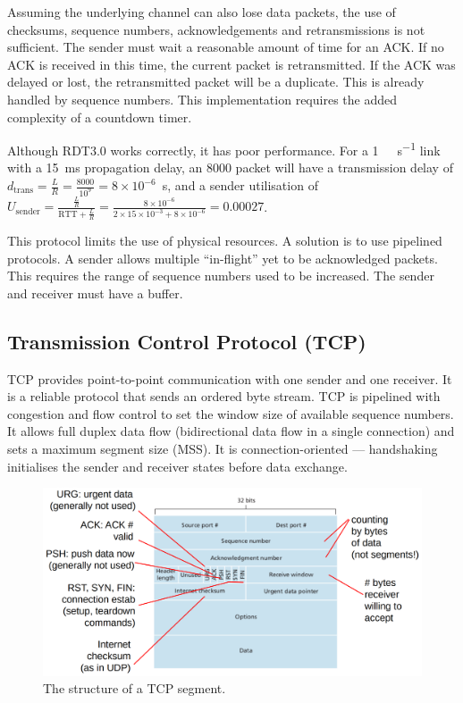 Assuming the underlying channel can also lose data packets, the use of checksums, sequence numbers, acknowledgements and retransmissions is not sufficient.
The sender must wait a reasonable amount of time for an ACK\@.
If no ACK is received in this time, the current packet is retransmitted.
If the ACK was delayed or lost, the retransmitted packet will be a duplicate.
This is already handled by sequence numbers.
This implementation requires the added complexity of a countdown timer.

Although RDT3.0 works correctly, it has poor performance.
For a \SI{1}{\giga\bit\per\second} link with a \SI{15}{\milli\second} propagation delay, an \SI{8000}{\bit} packet will have a transmission delay of \(d_{\text{trans}} = \frac{L}{R} = \frac{8000}{10^9} = 8 \times 10^{-6}\)~\si{\second}, and a sender utilisation of \(U_{\text{sender}} = \frac{\frac{L}{R}}{\text{RTT} + \frac{L}{R}} = \frac{8 \times 10^{-6}}{2 \times 15 \times 10^{-3} + 8 \times 10^{-6}} = 0.00027\).

This protocol limits the use of physical resources.
A solution is to use pipelined protocols.
A sender allows multiple ``in-flight'' yet to be acknowledged packets.
This requires the range of sequence numbers used to be increased.
The sender and receiver must have a buffer.

\subsection{Transmission Control Protocol (TCP)}

TCP provides point-to-point communication with one sender and one receiver.
It is a reliable protocol that sends an ordered byte stream.
TCP is pipelined with congestion and flow control to set the window size of available sequence numbers.
It allows full duplex data flow (bidirectional data flow in a single connection) and sets a maximum segment size (MSS).
It is connection-oriented --- handshaking initialises the sender and receiver states before data exchange.

\begin{figure}[htp]
  \centering
  \includegraphics[width=15cm]{unit-18/figures/tcp-segment.png}
  \caption*{The structure of a TCP segment.}
\end{figure}

